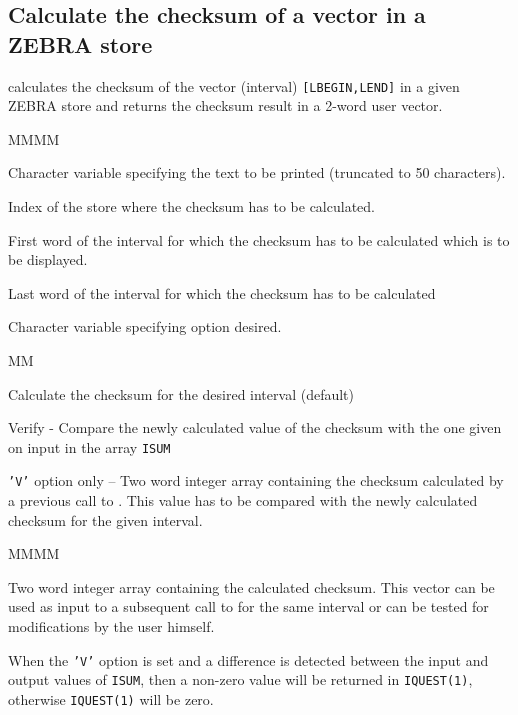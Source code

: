 \subsection{Calculate the checksum of a vector in a ZEBRA store}
\par
{} calculates the checksum of the vector (interval)
{\tt [LBEGIN,LEND]}
in a given ZEBRA store and returns the checksum result in a 2-word
user vector.
\Idesc
\begin{DL}{MMMM}
\item[CHTEXT]Character variable specifying the text to be printed
(truncated to 50 characters).
\item[IXSTOR]Index of the store where the checksum has to be calculated.
\item[LBEGIN]First word of the interval for which the checksum
has to be calculated
which is to be displayed.
\item[LEND]Last word of the interval for which the checksum
has to be calculated
\item[CHOPT]Character variable specifying option desired.
\begin{DL}{MM}
\item['C']Calculate the checksum for the desired interval (default)
\item['V']Verify - Compare the newly calculated value of the checksum with the
one given on input in the array {\tt ISUM}
\end{DL}
\item[*ISUM*]{\tt'V'} option only -- Two word integer array containing the
checksum calculated by a previous call to . This value has to be
compared with the newly calculated checksum for the given interval.
\end{DL}
\Odesc
\begin{DL}{MMMM}
\item[*ISUM*]Two word integer array containing the calculated checksum.
\newline This vector can be used as input to a subsequent call to
 for the same interval or can be tested for modifications by the
user himself.
\end{DL}
\par When the {\tt'V'} option is set and a difference is detected between the
input and output values of {\tt ISUM}, then a non-zero value will be
returned in {\tt IQUEST(1)}, otherwise {\tt IQUEST(1)} will be zero.
